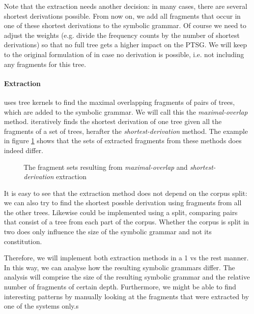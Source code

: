 Note that the \dops{} extraction needs another decision: in many cases, there are several shortest derivations possible. From now on, we add all fragments that occur in one of these shortest derivations to the symbolic grammar. Of course we need to adjust the weights (e.g. divide the frequency counts by the number of shortest derivations) so that no full tree gets a higher impact on the PTSG. We will keep to the original formulation of \dops{} in case no derivation is possible, i.e. not including any fragments for this tree.

\paragraph{Extraction}
\ddop{} uses tree kernels to find the maximal overlapping fragments of pairs of trees, which are added to the symbolic grammar. We will call this the \emph{maximal-overlap} method. \dops{} iteratively finds the shortest derivation of one tree given all the fragments of a set of trees, herafter the \emph{shortest-derivation} method. The example in figure \ref{f:differentSets} shows that the sets of extracted fragments from these methods does indeed differ.

\begin{figure}

\caption{The fragment sets resulting from \emph{maximal-overlap} and \emph{shortest-derivation} extraction}
\label{f:differentSets}
\end{figure}

It is easy to see that the \dops{} extraction method does not depend on the corpus split: we can also try to find the shortest possble derivation using fragments from all the other trees. Likewise \ddop{} could be implemented using a split, comparing pairs that consist of a tree from each part of the corpus. Whether the corpus is split in two does only influence the size of the symbolic grammar and not its constitution.

Therefore, we will implement both extraction methods in a 1 vs the rest manner. In this way, we can analyse how the resulting symbolic grammars differ. The analysis will comprise the size of the resulting symbolic grammar and the relative number of fragments of certain depth. Furthermore, we might be able to find interesting patterns by manually looking at the fragments that were extracted by one of the systems only.s

